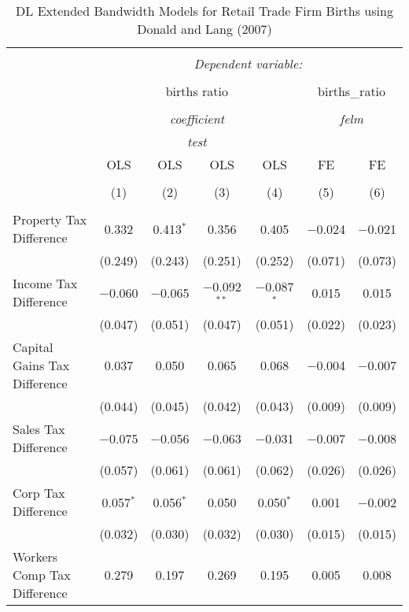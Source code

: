 
\begin{table}[!htbp] \centering 
  \caption{DL Extended Bandwidth Models for  Retail Trade Firm Births using Donald and Lang (2007)} 
  \label{} 
\begin{tabular}{@{\extracolsep{5pt}}lcccccc} 
\\[-1.8ex]\hline 
\hline \\[-1.8ex] 
 & \multicolumn{6}{c}{\textit{Dependent variable:}} \\ 
\cline{2-7} 
\\[-1.8ex] & \multicolumn{4}{c}{births ratio} & \multicolumn{2}{c}{births\_ratio} \\ 
\\[-1.8ex] & \multicolumn{4}{c}{\textit{coefficient}} & \multicolumn{2}{c}{\textit{felm}} \\ 
 & \multicolumn{4}{c}{\textit{test}} & \multicolumn{2}{c}{\textit{}} \\ 
 & OLS & OLS & OLS & OLS & FE & FE \\ 
\\[-1.8ex] & (1) & (2) & (3) & (4) & (5) & (6)\\ 
\hline \\[-1.8ex] 
 Property Tax Difference & 0.332 & 0.413$^{*}$ & 0.356 & 0.405 & $-$0.024 & $-$0.021 \\ 
  & (0.249) & (0.243) & (0.251) & (0.252) & (0.071) & (0.073) \\ 
  Income Tax Difference & $-$0.060 & $-$0.065 & $-$0.092$^{**}$ & $-$0.087$^{*}$ & 0.015 & 0.015 \\ 
  & (0.047) & (0.051) & (0.047) & (0.051) & (0.022) & (0.023) \\ 
  Capital Gains Tax Difference & 0.037 & 0.050 & 0.065 & 0.068 & $-$0.004 & $-$0.007 \\ 
  & (0.044) & (0.045) & (0.042) & (0.043) & (0.009) & (0.009) \\ 
  Sales Tax Difference & $-$0.075 & $-$0.056 & $-$0.063 & $-$0.031 & $-$0.007 & $-$0.008 \\ 
  & (0.057) & (0.061) & (0.061) & (0.062) & (0.026) & (0.026) \\ 
  Corp Tax Difference & 0.057$^{*}$ & 0.056$^{*}$ & 0.050 & 0.050$^{*}$ & 0.001 & $-$0.002 \\ 
  & (0.032) & (0.030) & (0.032) & (0.030) & (0.015) & (0.015) \\ 
  Workers Comp Tax Difference & 0.279 & 0.197 & 0.269 & 0.195 & 0.005 & 0.008 \\ 

\end{tabular}
\end{table}
